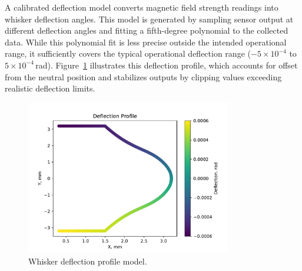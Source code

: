 A calibrated deflection model converts magnetic field strength readings into whisker deflection angles.
This model is generated by sampling sensor output at different deflection angles and fitting a fifth-degree polynomial to the collected data.
While this polynomial fit is less precise outside the intended operational range, it sufficiently covers the typical operational deflection range ($-5\times10^{-4}$ to $5\times10^{-4}$\,rad).
Figure~\ref{fig:deflection_profile} illustrates this deflection profile, which accounts for offset from the neutral position and stabilizes outputs by clipping values exceeding realistic deflection limits.

\begin{figure}[htb]
    \centering
    \includegraphics[width=0.8\textwidth]{figures/deflection_profile}
    \caption{Whisker deflection profile model.}
    \label{fig:deflection_profile}
\end{figure}
